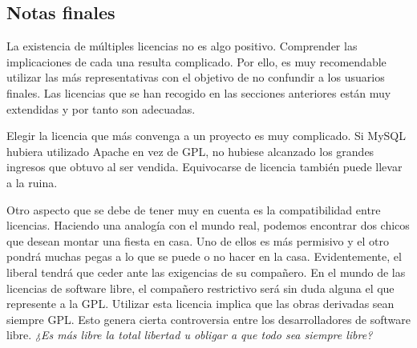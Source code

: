 \subsection{Notas finales}

La existencia de múltiples licencias no es algo positivo. Comprender
las implicaciones de cada una resulta complicado. Por ello, es muy
recomendable utilizar las más representativas con el objetivo de no
confundir a los usuarios finales. Las licencias que se han recogido en
las secciones anteriores están muy extendidas y por tanto son
adecuadas.

Elegir la licencia que más convenga a un proyecto es muy
complicado. Si MySQL hubiera utilizado Apache en vez de GPL, no
hubiese alcanzado los grandes ingresos que obtuvo al ser
vendida. Equivocarse de licencia también puede llevar a la ruina.

Otro aspecto que se debe de tener muy en cuenta es la compatibilidad
entre licencias. Haciendo una analogía con el mundo real, podemos
encontrar dos chicos que desean montar una fiesta en casa. Uno de
ellos es más permisivo y el otro pondrá muchas pegas a lo que se puede
o no hacer en la casa. Evidentemente, el liberal tendrá que ceder ante
las exigencias de su compañero. En el mundo de las licencias de
software libre, el compañero restrictivo será sin duda alguna el que
represente a la GPL. Utilizar esta licencia implica que las obras
derivadas sean siempre GPL. Esto genera cierta controversia entre los
desarrolladores de software libre. \emph{¿Es más libre la total
  libertad u obligar a que todo sea siempre libre?}
